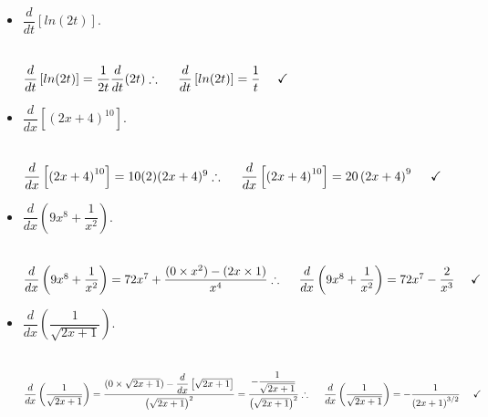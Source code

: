 \documentclass[fleqn]{article}
\begin{document}
\begin{enumerate}
\begin{itemize}
      \item $\dfrac{d}{dt} \left[ln(2t)\right]$.

        \textcolor{hwColor}{
          \\
          $
            \dfrac{d}{dt} \left[ln(2t)\right]=\dfrac{1}{2t} \dfrac{d}{dt} (2t)
            \\
            \\
            \\
            \therefore ~~~~ \dfrac{d}{dt} \left[ln(2t)\right]=\dfrac{1}{t} ~~~~ \checkmark
            \\
          $
        }

      \item $\dfrac{d}{dx} \left[\left(2x+4\right)^{10}\right]$.

        \textcolor{hwColor}{
          \\
          $
            \dfrac{d}{dx} \left[\left(2x+4\right)^{10}\right]=10(2)(2x+4)^9
            \\
            \\
            \\
            \therefore ~~~~ \dfrac{d}{dx} \left[\left(2x+4\right)^{10}\right]=20\left(2x+4\right)^9 ~~~~ \checkmark
            \\
          $
        }

      \item $\dfrac{d}{dx} \left(9x^8+\dfrac{1}{x^2}\right)$.

        \textcolor{hwColor}{
          \\
          $
            \dfrac{d}{dx} \left(9x^8+\dfrac{1}{x^2}\right)=72x^7+\dfrac{(0 \times x^2)-(2x \times 1)}{x^4}
            \\
            \\
            \\
            \therefore ~~~~ \dfrac{d}{dx} \left(9x^8+\dfrac{1}{x^2}\right)=72x^7-\dfrac{2}{x^3} ~~~~ \checkmark
            \\
          $
        }

      \item $\dfrac{d}{dx} \left(\dfrac{1}{\sqrt{2x+1}}\right)$.

        \textcolor{hwColor}{
          \\
          $
            \dfrac{d}{dx} \left(\dfrac{1}{\sqrt{2x+1}}\right)=\dfrac{(0 \times \sqrt{2x+1})-\dfrac{d}{dx} \left[\sqrt{2x+1}\right]}{\left(\sqrt{2x+1}\right)^2}
            =\dfrac{-\dfrac{1}{\sqrt{2x+1}}}{\left(\sqrt{2x+1}\right)^2}
            \\
            \\
            \\
            \therefore ~~~~ \dfrac{d}{dx} \left(\dfrac{1}{\sqrt{2x+1}}\right)=-\dfrac{1}{\left(2x+1\right)^{3/2}} ~~~~ \checkmark
            \\
          $
        }


\end{itemize}
\end{enumerate}
\end{document}
